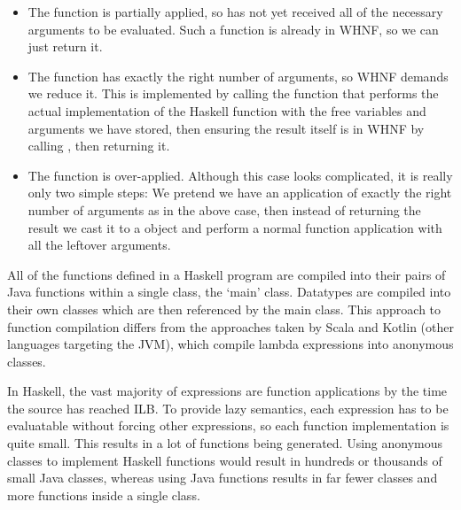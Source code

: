 \documentclass[dissertation.tex]{subfiles}
\begin{document}
{{{\begin{enumerate}
{                \begin{itemize}
                \item
                {
                    The function is partially applied, so has not yet received all of the necessary arguments to be evaluated. Such a function is already in WHNF, so we can just return it.
                }
                \item
                {
                    The function has exactly the right number of arguments, so WHNF demands we reduce it. This is implemented by calling the  function that performs the actual implementation of the Haskell function with the free variables and arguments we have stored, then ensuring the result itself is in WHNF by calling , then returning it.
                }
                \item
                {
                    The function is over-applied. Although this case looks complicated, it is really only two simple steps: We pretend we have an application of exactly the right number of arguments as in the above case, then instead of returning the result we cast it to a  object and perform a normal function application with all the leftover arguments.
                }
                \end{itemize}
            }
            \end{enumerate}

            All of the functions defined in a Haskell program are compiled into their pairs of Java functions within a single class, the `main' class. Datatypes are compiled into their own classes which are then referenced by the main class. This approach to function compilation differs from the approaches taken by Scala and Kotlin (other languages targeting the JVM), which compile lambda expressions into anonymous classes.

            In Haskell, the vast majority of expressions are function applications by the time the source has reached ILB. To provide lazy semantics, each expression has to be evaluatable without forcing other expressions, so each function implementation is quite small. This results in a lot of functions being generated. Using anonymous classes to implement Haskell functions would result in hundreds or thousands of small Java classes, whereas using Java functions results in far fewer classes and more functions inside a single class.
        }
    }
}
\end{document}
